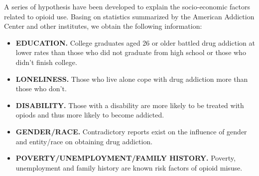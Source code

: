 A series of hypothesis have been developed to explain the socio-economic factors related to opioid use. Basing on statistics summarized by the American Addiction Center and other institutes\cite{10}\cite{11}, we obtain the following information:
\begin{itemize}
	\item \textbf{EDUCATION.} College graduates aged 26 or older battled drug addiction at lower rates than those who did not graduate from high school or those who didn’t finish college.
	\item \textbf{LONELINESS.} Those who live alone cope with drug addiction more than those who don't.
	\item \textbf{DISABILITY.} Those with a disability are more likely to be treated with opiods and thus more likely to become addicted.
	\item \textbf{GENDER/RACE.} Contradictory reports exist on the influence of gender and entity/race on obtaining drug addiction. 
	\item \textbf{POVERTY/UNEMPLOYMENT/FAMILY HISTORY.} Poverty, unemployment and family history are known risk factors of opioid misuse.
\end{itemize}


\begin{comment}
he above prior knowledge imply that education, loneliness, poverty, unemployment and family addiction history are the most influential factors. Contradicting reports regarding gender and entity factors allow us to assume that they play a minor part in opioid use.

Correspondingly, in the dataset, we choose \textit{\bfseries HC03\_VC85}(low educational background), \textit{\bfseries HC03\_VC14}(Nonfamily households - Householder living alone) and \textit{\bfseries HC01\_VC103}(DISABILITY STATUS OF THE CIVILIAN NONINSTITUTIONALIZED POPULATION - Total Civilian Noninstitutionalized Population). Let them be $Y_1$, $Y_2$ and $Y_3$ Further investigation showed that \textit{\bfseries HC01\_VC103} and all other disability-relevant factors were missing and therefore removed in the data cleansing proceidure. Therefore, we attempt to obtain $\lambda$ through linear regression by fitting
\begin{equation}
\lambda = \beta_1 Y_1 + \beta_2 Y_2
\end{equation}
\subsubsection{Linear Regression}
\end{comment}




